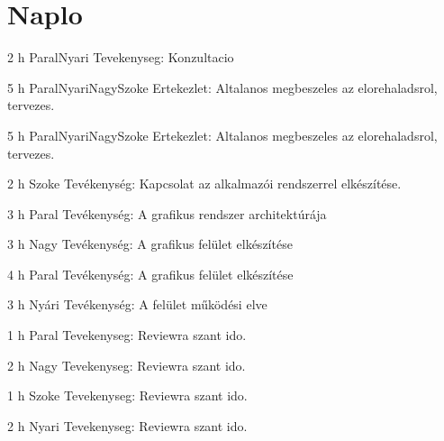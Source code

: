 \section{Naplo}
\begin{naplo}

            {2 h}
            {Paral\newline Nyari\newline}
            {Tevekenyseg: Konzultacio}
           

            {5 h}
            {Paral\newline Nyari\newline Nagy\newline Szoke}
            {Ertekezlet: Altalanos megbeszeles az elorehaladsrol, tervezes.}
           

            {5 h}
            {Paral\newline Nyari\newline Nagy\newline Szoke}
            {Ertekezlet: Altalanos megbeszeles az elorehaladsrol, tervezes.}
           

            {2 h}
            {Szoke}
            {Tevékenység: Kapcsolat az alkalmazói rendszerrel elkészítése.}
           

            {3 h}
            {Paral}
            {Tevékenység: A grafikus rendszer architektúrája}

            {3 h}
            {Nagy}
            {Tevékenység: A grafikus felület elkészítése}
           
            {4 h}
            {Paral}
            {Tevékenység: A grafikus felület elkészítése}
            
            {3 h}
            {Nyári}
            {Tevékenység: A felület működési elve}

            {1 h}
            {Paral}
            {Tevekenyseg: Reviewra szant ido.}
           

            {2 h}
            {Nagy}
            {Tevekenyseg: Reviewra szant ido.}
           

            {1 h}
            {Szoke}
            {Tevekenyseg: Reviewra szant ido.}
           

            {2 h}
            {Nyari}
            {Tevekenyseg: Reviewra szant ido.}
           
\end{naplo}

